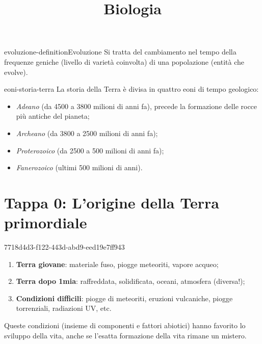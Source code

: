 \documentclass[preview]{standalone}
\begin{document}
\title{Biologia}
\genpage

\begin{snippetdefinition}{evoluzione-definition}{Evoluzione}
    Si tratta del cambiamento nel tempo della frequenze geniche (livello di varietà coinvolta)
    di una popolazione (entità che evolve).
\end{snippetdefinition}

\begin{snippet}{eoni-storia-terra}
    La storia della Terra è divisa in quattro eoni di tempo geologico:
    \begin{itemize}
        \item \textit{Adeano} (da 4500 a 3800 milioni di anni fa), precede
        la formazione delle rocce più antiche del pianeta;
        \item \textit{Archeano} (da 3800 a 2500 milioni di anni fa);
        \item \textit{Proterozoico} (da 2500 a 500 milioni di anni fa);
        \item \textit{Fanerozoico} (ultimi 500 milioni di anni).
    \end{itemize}
\end{snippet}


\section{Tappa 0: L'origine della Terra primordiale}

\begin{snippet}{7718d4d3-f122-443d-abd9-eed19e7ff943}
    \begin{enumerate}
        \item \textbf{Terra giovane}: materiale fuso, piogge meteoriti, vapore acqueo;
        \item \textbf{Terra dopo 1mia}: raffreddata, solidificata, oceani, atmosfera (diversa!);
        \item \textbf{Condizioni difficili}: piogge di meteoriti, eruzioni vulcaniche, piogge torrenziali, radiazioni UV, etc.
    \end{enumerate}

    Queste condizioni (insieme di componenti e fattori abiotici) hanno
    favorito lo sviluppo della vita, anche se l'esatta formazione della vita rimane un mistero.
\end{snippet}
\end{document}
